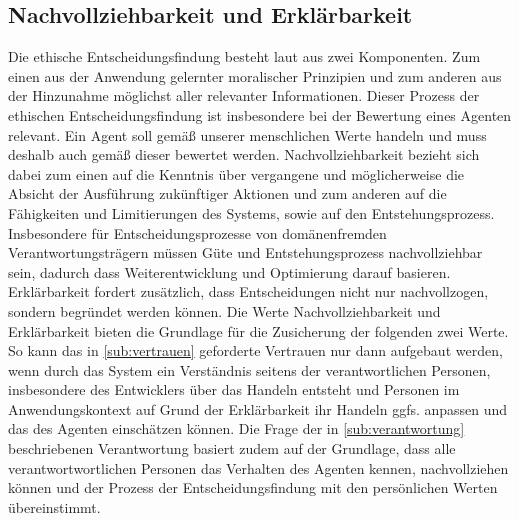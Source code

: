 \subsection{Nachvollziehbarkeit und Erklärbarkeit}\label{sub:nachvollziehbarkeit}
Die ethische Entscheidungsfindung besteht laut \cite[S. 4]{tannsjo2018} aus zwei Komponenten.
Zum einen aus der Anwendung gelernter moralischer Prinzipien und zum anderen aus der Hinzunahme möglichst aller relevanter Informationen.
Dieser Prozess der ethischen Entscheidungsfindung ist insbesondere bei der Bewertung eines Agenten relevant.
Ein Agent soll gemäß unserer menschlichen Werte handeln und muss deshalb auch gemäß dieser bewertet werden.
Nachvollziehbarkeit bezieht sich dabei zum einen auf die Kenntnis über vergangene und möglicherweise die Absicht der Ausführung zukünftiger Aktionen und zum anderen auf die Fähigkeiten und Limitierungen des Systems, sowie auf den Entstehungsprozess.
Insbesondere für Entscheidungsprozesse von domänenfremden Verantwortungsträgern müssen Güte und Entstehungsprozess nachvollziehbar sein, dadurch dass Weiterentwicklung und Optimierung darauf basieren.
Erklärbarkeit fordert zusätzlich, dass Entscheidungen nicht nur nachvollzogen, sondern begründet werden können.
Die Werte Nachvollziehbarkeit und Erklärbarkeit bieten die Grundlage für die Zusicherung der folgenden zwei Werte.
So kann das in \autoref{sub:vertrauen} geforderte Vertrauen nur dann aufgebaut werden, wenn durch das System ein Verständnis seitens der verantwortlichen Personen, insbesondere des Entwicklers über das Handeln entsteht und Personen im Anwendungskontext auf Grund der Erklärbarkeit ihr Handeln ggfs. anpassen und das des Agenten einschätzen können.
Die Frage der in \autoref{sub:verantwortung} beschriebenen Verantwortung basiert zudem auf der Grundlage, dass alle verantwortwortlichen Personen das Verhalten des Agenten kennen, nachvollziehen können und der Prozess der Entscheidungsfindung mit den persönlichen Werten übereinstimmt.

